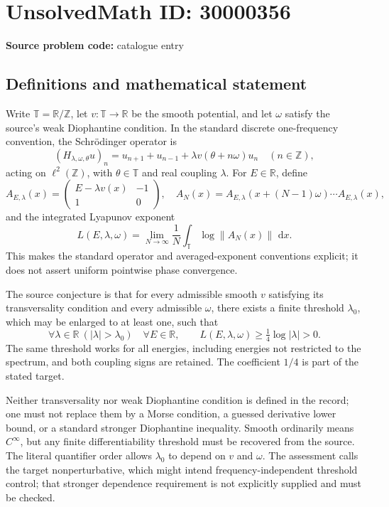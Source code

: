 \documentclass[11pt]{article}
\newcommand{\Z}{\mathbb{Z}}
\newcommand{\R}{\mathbb{R}}
\newcommand{\dd}{\,\mathrm{d}}
\begin{document}
\section*{UnsolvedMath ID: 30000356}
\textbf{Source problem code:} catalogue entry
\subsection{Definitions and mathematical statement}
Write \(\mathbb T=\R/\Z\), let \(v:\mathbb T\to\R\) be the smooth potential, and let \(\omega\) satisfy the source's weak Diophantine condition. In the standard discrete one-frequency convention, the Schr\"odinger operator is
\[
(H_{\lambda,\omega,\theta}u)_n=u_{n+1}+u_{n-1}+\lambda v(\theta+n\omega)u_n
\quad(n\in\Z),
\]
acting on \(\ell^2(\Z)\), with \(\theta\in\mathbb T\) and real coupling \(\lambda\). For \(E\in\R\), define
\[
A_{E,\lambda}(x)=\begin{pmatrix}E-\lambda v(x)&-1\\1&0\end{pmatrix},
\quad A_N(x)=A_{E,\lambda}(x+(N-1)\omega)\cdots A_{E,\lambda}(x),
\]
and the integrated Lyapunov exponent
\[
L(E,\lambda,\omega)=\lim_{N\to\infty}\frac1N\int_{\mathbb T}\log\|A_N(x)\|\,\dd x.
\]
This makes the standard operator and averaged-exponent conventions explicit; it does not assert uniform pointwise phase convergence.

The source conjecture is that for every admissible smooth \(v\) satisfying its transversality condition and every admissible \(\omega\), there exists a finite threshold \(\lambda_0\), which may be enlarged to at least one, such that
\[
\forall\lambda\in\R\ (|\lambda|>\lambda_0)\quad\forall E\in\R,\qquad
L(E,\lambda,\omega)\geq\tfrac14\log|\lambda|>0.
\]
The same threshold works for all energies, including energies not restricted to the spectrum, and both coupling signs are retained. The coefficient \(1/4\) is part of the stated target.

Neither transversality nor weak Diophantine condition is defined in the record; one must not replace them by a Morse condition, a guessed derivative lower bound, or a standard stronger Diophantine inequality. Smooth ordinarily means \(C^\infty\), but any finite differentiability threshold must be recovered from the source. The literal quantifier order allows \(\lambda_0\) to depend on \(v\) and \(\omega\). The assessment calls the target nonperturbative, which might intend frequency-independent threshold control; that stronger dependence requirement is not explicitly supplied and must be checked.
\end{document}
